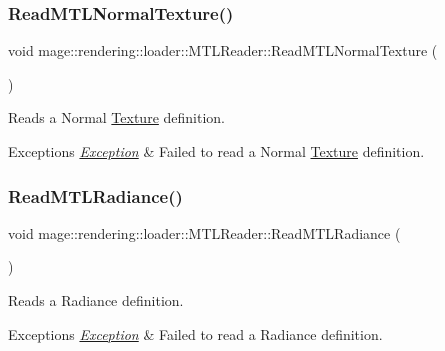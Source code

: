 \subsubsection{\texorpdfstring{Read\+M\+T\+L\+Normal\+Texture()}{ReadMTLNormalTexture()}}
{\footnotesize\ttfamily void mage\+::rendering\+::loader\+::\+M\+T\+L\+Reader\+::\+Read\+M\+T\+L\+Normal\+Texture (\begin{DoxyParamCaption}{ }\end{DoxyParamCaption})\hspace{0.3cm}{\ttfamily [private]}}

Reads a Normal \hyperlink{classmage_1_1rendering_1_1_texture}{Texture} definition.


\begin{DoxyExceptions}{Exceptions}
{\em \hyperlink{classmage_1_1_exception}{Exception}} & Failed to read a Normal \hyperlink{classmage_1_1rendering_1_1_texture}{Texture} definition. \\
\hline
\end{DoxyExceptions}
\hypertarget{classmage_1_1rendering_1_1loader_1_1_m_t_l_reader_acfafc2485c4b84ef84360e35ac8247eb}{}\label{classmage_1_1rendering_1_1loader_1_1_m_t_l_reader_acfafc2485c4b84ef84360e35ac8247eb} 
\subsubsection{\texorpdfstring{Read\+M\+T\+L\+Radiance()}{ReadMTLRadiance()}}
{\footnotesize\ttfamily void mage\+::rendering\+::loader\+::\+M\+T\+L\+Reader\+::\+Read\+M\+T\+L\+Radiance (\begin{DoxyParamCaption}{ }\end{DoxyParamCaption})\hspace{0.3cm}{\ttfamily [private]}}

Reads a Radiance definition.


\begin{DoxyExceptions}{Exceptions}
{\em \hyperlink{classmage_1_1_exception}{Exception}} & Failed to read a Radiance definition. \\
\hline
\end{DoxyExceptions}
\hypertarget{classmage_1_1rendering_1_1loader_1_1_m_t_l_reader_a01438c92852592fd719a85d146e38b65}{}\label{classmage_1_1rendering_1_1loader_1_1_m_t_l_reader_a01438c92852592fd719a85d146e38b65} 
